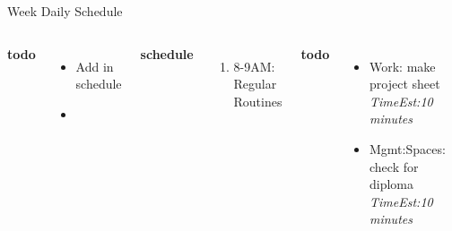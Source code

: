\documentclass[serif, mathserif, final]{beamer}
\newcommand{\te}[1]{\textit{TimeEst:}\textit{#1}}
\begin{document}
\begin{frame}
\begin{columns}
\begin{column}{0.50\linewidth}
      \begin{block}{Week Daily Schedule} 
        \begin{columns} 
          \textbf{\small todo} \\ 
          \begin{itemize}
            \tiny \item \tiny Add in schedule
          \item \tiny 
          \end{itemize} 
          \textbf{\small schedule} \\
          \begin{enumerate} 
            \tiny \item \tiny 8-9AM: Regular Routines 
          \end{enumerate} 
          
          \textbf{\small todo} \\
          \begin{itemize}
            \tiny \item \tiny Work: make project sheet \te{10 minutes} 
          \item \tiny Mgmt:Spaces: check for diploma \te{10 minutes} 
          \end{itemize}  
          \textbf{\small schedule} 
          \begin{enumerate}
            \tiny \item \tiny 10AM - 11AM = 
          \item \tiny 11AM - 12AM = make long-term goals 
          \item \tiny 12PM - 2PM = 
            \tiny \item \tiny 2PM -3PM = 
          \item \tiny 6PM - 10PM = 
          \end{enumerate} 
          

\end{columns}
\end{block}
\end{column}
\end{columns}
\end{frame}
\end{document}
